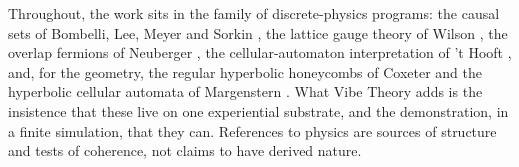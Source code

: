Throughout, the work sits in the family of discrete-physics programs: the causal sets of Bombelli,
Lee, Meyer and Sorkin \citeyearpar{bombelli1987spacetime}, the lattice gauge theory of Wilson \citeyearpar{wilson1974confinement}, the overlap fermions of
Neuberger \citeyearpar{neuberger1998exactly}, the cellular-automaton interpretation of 't Hooft \citeyearpar{thooft2016cellular}, and, for the geometry,
the regular hyperbolic honeycombs of Coxeter \citeyearpar{coxeter1973regular} and the hyperbolic cellular automata of
Margenstern \citeyearpar{margenstern2013small}. What Vibe Theory adds is the insistence that these live on one experiential
substrate, and the demonstration, in a finite simulation, that they can. References to physics are
sources of structure and tests of coherence, not claims to have derived nature.
